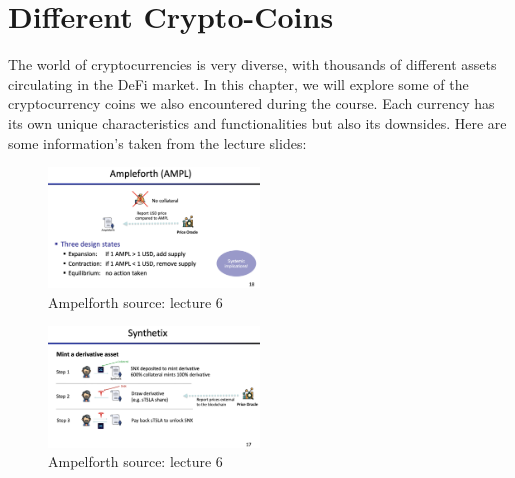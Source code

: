 \documentclass{article}
\begin{document}
\section{Different Crypto-Coins}
The world of cryptocurrencies is very diverse, with thousands of different assets circulating in the DeFi market. In this chapter, we will explore some of the cryptocurrency coins we also encountered during the course. Each currency has its own unique characteristics and functionalities but also its downsides. Here are some information's taken from the lecture slides:\\
\begin{figure}[h]
    \centering
    \includegraphics[width=0.5\textwidth]{Bildschirmfoto 2024-04-07 um 17.45.27.png} 
    \caption{Ampelforth \scriptsize{source: lecture 6}}
    \label{fig:DoS-attack}
\end{figure}
\begin{figure}[h]
    \centering
    \includegraphics[width=0.5\textwidth]{Bildschirmfoto 2024-04-07 um 17.45.18.png} 
    \caption{Ampelforth \scriptsize{source: lecture 6}}
    \label{fig:DoS-attack}
\end{figure}
\end{document}
